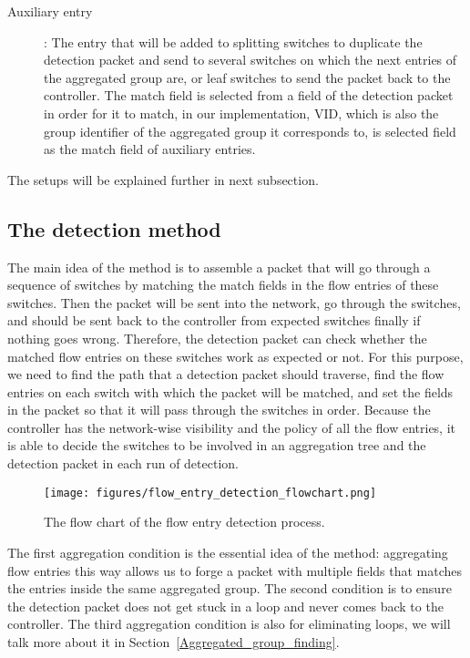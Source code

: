 \begin{description}
\item 
[Auxiliary entry]:
The entry that will be added to splitting switches to duplicate the detection packet and send to several  switches on which the next entries of the aggregated group are, or leaf switches to send the packet back to the controller. The match field is selected from a field of the detection packet in order for it to match, in our implementation, VID, which is also the group identifier of the aggregated group it corresponds to, is selected field as the match field of auxiliary entries.
\end{description}

The setups will be explained further in next subsection.

\subsection{The detection method}
\label{Detection_method}

The main idea of the method is to assemble a packet that will go through a sequence of switches by matching the match fields in the flow entries of these switches. Then the packet will be sent into the network, go through the switches, and should be sent back to the controller from expected switches finally if nothing goes wrong. Therefore, the detection packet can check whether the matched flow entries on these switches work as expected or not. For this purpose, we need to find the path that a detection packet should traverse, find the flow entries on each switch with which the packet will be matched, and set the fields in the packet so that it will pass through the switches in order. Because the controller has the network-wise visibility and the policy of all the flow entries, it is able to decide the switches to be involved in an aggregation tree and the detection packet in each run of detection. 

\begin{figure}[H]
\centering
\texttt{[image: figures/flow\_entry\_detection\_flowchart.png]}
\caption{The flow chart of the flow entry detection process.}
\label{flow_entry_detection_flowchart}
\end{figure}

The first aggregation condition is the essential idea of the method: aggregating flow entries this way allows us to forge a packet with multiple fields that matches the entries inside the same aggregated group. The second condition is to ensure the detection packet does not get stuck in a loop and never comes back to the controller. The third aggregation condition is also for eliminating loops, we will talk more about it in Section~\ref{Aggregated_group_finding}.

